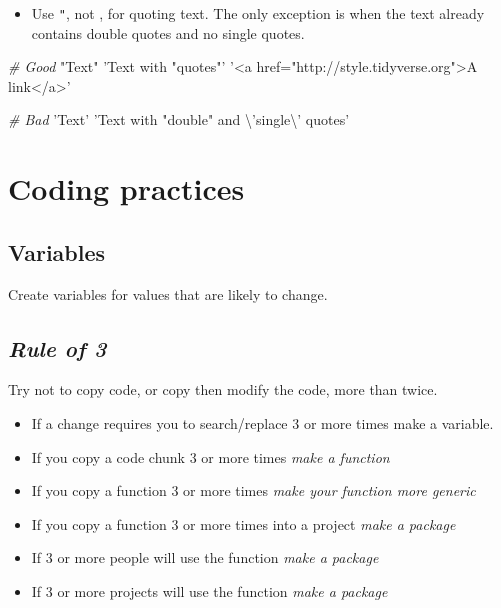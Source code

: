 \documentclass[]{book}
\newenvironment{Shaded}{\begin{snugshade}}{\end{snugshade}}
\newcommand{\CharTok}[1]{\textcolor[rgb]{0.31,0.60,0.02}{#1}}
\newcommand{\StringTok}[1]{\textcolor[rgb]{0.31,0.60,0.02}{#1}}
\newcommand{\CommentTok}[1]{\textcolor[rgb]{0.56,0.35,0.01}{\textit{#1}}}
\providecommand{\tightlist}{%
  \setlength{\itemsep}{0pt}\setlength{\parskip}{0pt}}
\theoremstyle{definition}
\theoremstyle{definition}
\theoremstyle{definition}
\theoremstyle{remark}
\begin{document}
\begin{itemize}
\tightlist
\item
  Use \texttt{"}, not \texttt{\textquotesingle{}}, for quoting text. The
  only exception is when the text already contains double quotes and no
  single quotes.
\end{itemize}

\begin{Shaded}
\begin{Highlighting}[]
\CommentTok{# Good}
\StringTok{"Text"}
\StringTok{'Text with "quotes"'}
\StringTok{'<a href="http://style.tidyverse.org">A link</a>'}

\CommentTok{# Bad}
\StringTok{'Text'}
\StringTok{'Text with "double" and }\CharTok{\textbackslash{}'}\StringTok{single}\CharTok{\textbackslash{}'}\StringTok{ quotes'}
\end{Highlighting}
\end{Shaded}

\section{Coding practices}\label{coding-practices}

\subsection{Variables}\label{variables}

Create variables for values that are likely to change.

\subsection{\texorpdfstring{\emph{Rule of
3}}{Rule of 3}}\label{rule-of-3}

Try not to copy code, or copy then modify the code, more than twice.

\begin{itemize}
\tightlist
\item
  If a change requires you to search/replace 3 or more times make a
  variable.
\item
  If you copy a code chunk 3 or more times \emph{make a function}
\item
  If you copy a function 3 or more times \emph{make your function more
  generic}
\item
  If you copy a function 3 or more times into a project \emph{make a
  package}
\item
  If 3 or more people will use the function \emph{make a package}
\item
  If 3 or more projects will use the function \emph{make a package}
\end{itemize}
\end{document}
